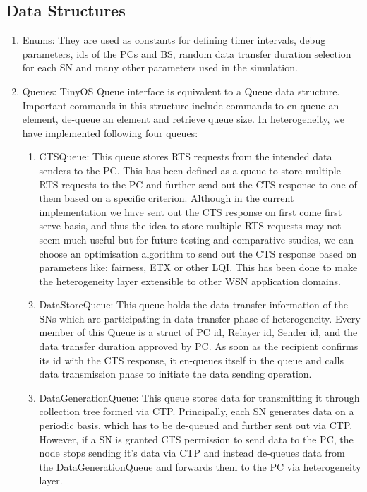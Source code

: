     \subsection{Data Structures}
        \begin{enumerate}
            \item Enums: They are used as constants for defining timer intervals, debug parameters, ids of the \acp{PC} and \ac{BS}, random data transfer duration selection for each \ac{SN} and many other parameters used in the simulation.
            
            \item Queues: TinyOS Queue interface is equivalent to a Queue data structure. Important commands in this structure include commands to en-queue an element, de-queue an element and retrieve queue size. In heterogeneity, we have implemented following four queues:
            
                \begin{enumerate}
                    \item CTSQueue: This queue stores \ac{RTS} requests from the intended data senders to the \ac{PC}. This has been defined as a queue to store multiple \ac{RTS} requests to the \ac{PC} and further send out the \ac{CTS} response to one of them based on a specific criterion. Although in the current implementation we have sent out the \ac{CTS} response on first come first serve basis, and thus the idea to store multiple \ac{RTS} requests may not seem much useful but for future testing and comparative studies, we can choose an optimisation algorithm to send out the \ac{CTS} response based on parameters like: fairness, \ac{ETX} or other \ac{LQI}. This has been done to make the heterogeneity layer extensible to other \ac{WSN} application domains. 
                    
                    \item DataStoreQueue: This queue holds the data transfer information of the \acp{SN} which are participating in data transfer phase of heterogeneity. Every member of this Queue is a struct of \ac{PC} id, Relayer id, Sender id, and the data transfer duration approved by \ac{PC}. As soon as the recipient confirms its id with the \ac{CTS} response, it en-queues itself in the queue and calls data transmission phase to initiate the data sending operation.
                    
                    \item DataGenerationQueue: This queue stores data for transmitting it through collection tree formed via \ac{CTP}. Principally, each \ac{SN} generates data on a periodic basis, which has to be de-queued and further sent out via \ac{CTP}. However, if a \ac{SN} is granted \ac{CTS} permission to send data to the \ac{PC}, the node stops sending it's data via \ac{CTP} and instead de-queues data from the DataGenerationQueue and forwards them to the \ac{PC} via heterogeneity layer.
                    

\end{enumerate}
\end{enumerate}
